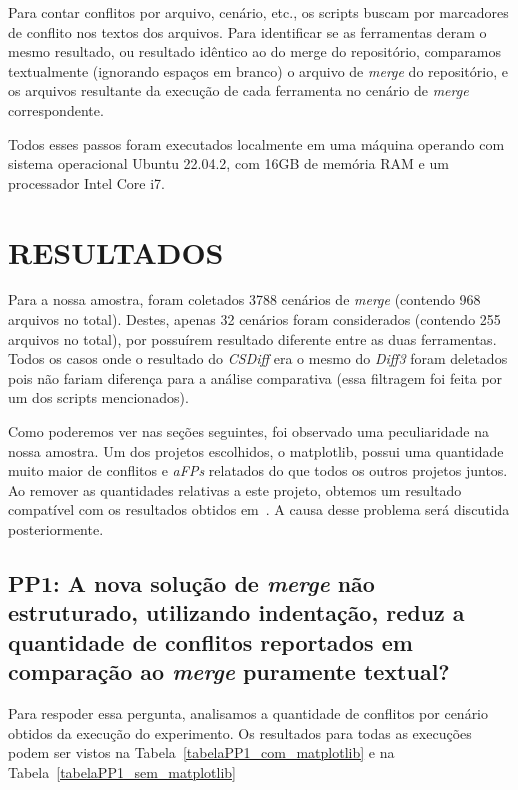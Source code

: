 Para contar conflitos por arquivo, cenário, etc., os scripts buscam por
marcadores de conflito nos textos dos arquivos. Para identificar se as
ferramentas deram o mesmo resultado, ou resultado idêntico ao do merge do
repositório, comparamos textualmente (ignorando espaços em branco) o arquivo de
\emph{merge} do repositório, e os arquivos resultante da execução de cada
ferramenta no cenário de \emph{merge} correspondente.

Todos esses passos foram executados localmente em uma máquina operando com
sistema operacional Ubuntu 22.04.2, com 16GB de memória RAM e um processador
Intel Core i7.

\section{RESULTADOS}

Para a nossa amostra, foram coletados 3788 cenários de \emph{merge} (contendo
968 arquivos no total). Destes, apenas 32 cenários foram considerados (contendo
255 arquivos no total), por possuírem resultado diferente entre as duas
ferramentas. Todos os casos onde o resultado do \emph{CSDiff} era o mesmo do
\emph{Diff3} foram deletados pois não fariam diferença para a análise
comparativa (essa filtragem foi feita por um dos scripts mencionados).

Como poderemos ver nas seções seguintes, foi observado uma peculiaridade na
nossa amostra. Um dos projetos escolhidos, o matplotlib, possui uma quantidade
muito maior de conflitos e \emph{aFPs} relatados do que todos os outros
projetos juntos. Ao remover as quantidades relativas a este projeto, obtemos um
resultado compatível com os resultados obtidos
em~\cite{clem21,heitor21}. A causa desse problema será discutida
posteriormente.

\subsection{PP1: A nova solução de \emph{merge} não estruturado, utilizando
	indentação, reduz a quantidade de conflitos reportados em comparação ao
	\emph{merge} puramente textual?}

Para respoder essa pergunta, analisamos a quantidade de conflitos por cenário
obtidos da execução do experimento. Os resultados para todas as execuções podem
ser vistos na Tabela~\ref{tabelaPP1_com_matplotlib} e na
Tabela~\ref{tabelaPP1_sem_matplotlib}

